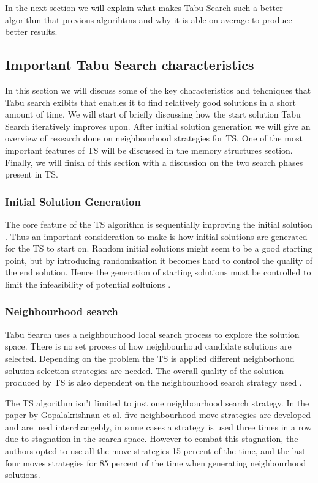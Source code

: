 In the next section we will explain what makes Tabu Search such a better algorithm that previous algorihtms and why it is able on average to produce better results.

\subsection{Important Tabu Search characteristics}
In this section we will discuss some of the key characteristics and tehcniques that Tabu search exibits that enables it to find relatively good solutions in a short amount of time. We will start of briefly discussing how the start solution Tabu Search iteratively improves upon. After initial solution generation we will give an overview of research done on neighbourhood strategies for TS. One of the most important features of TS will be discussed in the memory structures section. Finally, we will finish of this section with a discussion on the two search phases present in TS.

\subsubsection{Initial Solution Generation}
The core feature of the TS algorithm is sequentially improving the initial solution \cite{TSHazardous}. Thus an important consideration to make is how initial solutions are generated for the TS to start on. Random initial solutions might seem to be a good starting point, but by introducing randomization it becomes hard to control the quality of the end solution. Hence the generation of starting solutions must be controlled to limit the infeasibility of potential soltuions \cite{TSHazardous}.

\subsubsection{Neighbourhood search}
Tabu Search uses a neighbourhood local search process to explore the solution space. There is no set process of how neighbourhoud candidate solutions are selected. Depending on the problem the TS is applied different neighborhoud solution selection strategies are needed. The overall quality of the solution produced by TS is also dependent on the neighbourhood search strategy used \cite{TSHazardous}. 

The TS algorithm isn't limited to just one neighbourhood search strategy. In the paper by Gopalakrishnan et al.\cite{TabuCarryOver} five neighbourhood move strategies are developed and are used interchangebly, in some cases a strategy is used three times in a row due to stagnation in the search space. However to combat this stagnation, the authors opted to use all the move strategies 15 percent of the time, and the last four moves strategies for 85 percent of the time when generating neighbourhood solutions.

